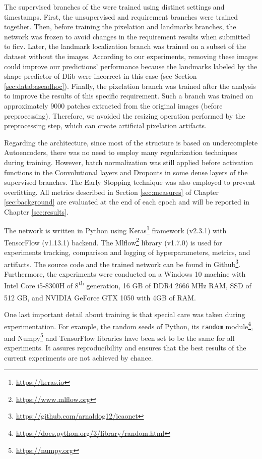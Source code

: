 The supervised branches of the \methodname were trained using distinct settings and timestamps. First, the unsupervised and requirement branches were trained together. Then, before training the pixelation and landmarks branches, the network was frozen to avoid changes in the requirement results when submitted to \acs{ficv}. Later, the landmark localization branch was trained on a subset of the \adhoc dataset without the \darktintedlenses images. According to our experiments, removing these images could improve our predictions' performance because the landmarks labeled by the shape predictor of Dlib were incorrect in this case (see Section \ref{sec:databaseadhoc}). Finally, the pixelation branch was trained after the analysis to improve the results of this specific requirement. Such a branch was trained on approximately 9000 patches extracted from the original images (before preprocessing). Therefore, we avoided the resizing operation performed by the preprocessing step, which can create artificial pixelation artifacts.
 
Regarding the architecture, since most of the \methodname structure is based on undercomplete Autoencoders, there was no need to employ many regularization techniques during training. However, batch normalization was still applied before activation functions in the Convolutional layers and Dropouts in some dense layers of the supervised branches. The Early Stopping technique was also employed to prevent overfitting. All metrics described in Section \ref{sec:measures} of Chapter \ref{sec:background} are evaluated at the end of each epoch and will be reported in Chapter \ref{sec:results}.
 
The network is written in Python using Keras\footnote{\url{https://keras.io}} framework (v2.3.1) with TensorFlow (v1.13.1) backend. The Mlflow\footnote{\url{https://www.mlflow.org}} library (v1.7.0) is used for experiments tracking, comparison and logging of hyperparameters, metrics, and artifacts. The source code and the trained network can be found in Github\footnote{\url{https://github.com/arnaldog12/icaonet}}. Furthermore, the experiments were conducted on a Windows 10 machine with Intel\textsuperscript{\tiny\textregistered} Core\textsuperscript{\tiny\texttrademark} i5-8300H of 8\textsuperscript{th} generation, 16 GB of DDR4 2666 MHz RAM, SSD of 512 GB, and NVIDIA\textsuperscript{\tiny\textregistered} GeForce\textsuperscript{\tiny\textregistered} GTX 1050 with 4GB of RAM.
 
One last important detail about \methodname training is that special care was taken during experimentation. For example, the random seeds of Python, its \texttt{random} module\footnote{\url{https://docs.python.org/3/library/random.html}}, and Numpy\footnote{\url{https://numpy.org}} and TensorFlow libraries have been set to be the same for all experiments. It assures reproducibility and ensures that the best results of the current experiments are not achieved by chance.
 
